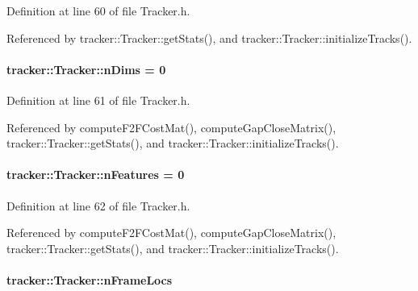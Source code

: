 Definition at line 60 of file Tracker.\+h.



Referenced by tracker\+::\+Tracker\+::get\+Stats(), and tracker\+::\+Tracker\+::initialize\+Tracks().

\paragraph[{\texorpdfstring{n\+Dims}{nDims}}]{ tracker\+::\+Tracker\+::n\+Dims = 0\hspace{0.3cm}{\ttfamily [inherited]}}\hypertarget{classtracker_1_1Tracker_a5efb17589760984816411fb6f69d561d}{}\label{classtracker_1_1Tracker_a5efb17589760984816411fb6f69d561d}


Definition at line 61 of file Tracker.\+h.



Referenced by compute\+F2\+F\+Cost\+Mat(), compute\+Gap\+Close\+Matrix(), tracker\+::\+Tracker\+::get\+Stats(), and tracker\+::\+Tracker\+::initialize\+Tracks().

\paragraph[{\texorpdfstring{n\+Features}{nFeatures}}]{ tracker\+::\+Tracker\+::n\+Features = 0\hspace{0.3cm}{\ttfamily [inherited]}}\hypertarget{classtracker_1_1Tracker_ade0b77f0b5ffc71aecddc70593ec16bb}{}\label{classtracker_1_1Tracker_ade0b77f0b5ffc71aecddc70593ec16bb}


Definition at line 62 of file Tracker.\+h.



Referenced by compute\+F2\+F\+Cost\+Mat(), compute\+Gap\+Close\+Matrix(), tracker\+::\+Tracker\+::get\+Stats(), and tracker\+::\+Tracker\+::initialize\+Tracks().

\paragraph[{\texorpdfstring{n\+Frame\+Locs}{nFrameLocs}}]{ tracker\+::\+Tracker\+::n\+Frame\+Locs\hspace{0.3cm}{\ttfamily [inherited]}}\hypertarget{classtracker_1_1Tracker_a84d3000b7a2b7a2566791f05d3b8afcb}{}\label{classtracker_1_1Tracker_a84d3000b7a2b7a2566791f05d3b8afcb}


